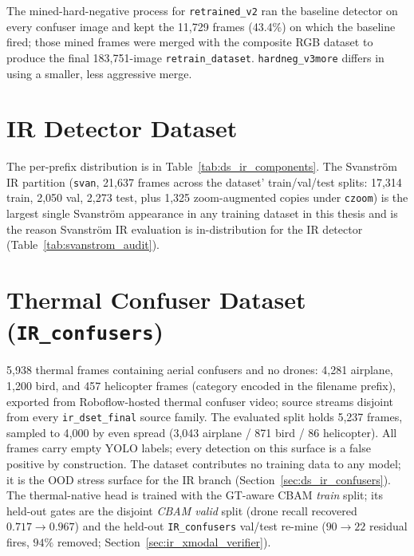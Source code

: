 \noindent The mined-hard-negative process for \texttt{retrained\_v2} ran the baseline detector on every confuser image and kept the 11{,}729 frames (43.4\%) on which the baseline fired; those mined frames were merged with the composite RGB dataset to produce the final 183{,}751-image \texttt{retrain\_dataset}. \texttt{hardneg\_v3more} differs in using a smaller, less aggressive merge.

\section{IR Detector Dataset}

The per-prefix distribution is in Table~\ref{tab:ds_ir_components}. The Svanstr\"om IR partition (\texttt{svan}, 21{,}637 frames across the dataset' train/val/test splits: 17{,}314 train, 2{,}050 val, 2{,}273 test, plus 1{,}325 zoom-augmented copies under \texttt{czoom}) is the largest single Svanstr\"om appearance in any training dataset in this thesis and is the reason Svanstr\"om IR evaluation is in-distribution for the IR detector (Table~\ref{tab:svanstrom_audit}).

\section{Thermal Confuser Dataset (\texttt{IR\_confusers})}

5{,}938 thermal frames containing aerial confusers and no drones: 4{,}281 airplane, 1{,}200 bird, and 457 helicopter frames (category encoded in the filename prefix), exported from Roboflow-hosted thermal confuser video; source streams disjoint from every \texttt{ir\_dset\_final} source family. The evaluated split holds 5{,}237 frames, sampled to 4{,}000 by even spread (3{,}043 airplane / 871 bird / 86 helicopter). All frames carry empty YOLO labels; every detection on this surface is a false positive by construction. The dataset contributes no training data to any model; it is the OOD stress surface for the IR branch (Section~\ref{sec:ds_ir_confusers}). The thermal-native head is trained with the GT-aware CBAM \emph{train} split; its held-out gates are the disjoint \emph{CBAM valid} split (drone recall recovered $0.717 \to 0.967$) and the held-out \texttt{IR\_confusers} val/test re-mine ($90 \to 22$ residual fires, $94\%$ removed; Section~\ref{sec:ir_xmodal_verifier}).

